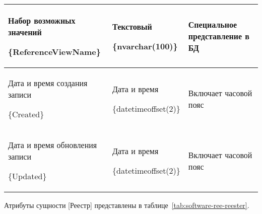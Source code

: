 \begin{myTable}
\begin{longtable}[h]{|p{}|p{}|p{}|}
	Набор возможных значений \par \{ReferenceViewName\} & Текстовый \par \{nvarchar(100)\} & Специальное представление в БД \\ \hline
	Дата и время создания записи \par \{Created\} & Дата и время \par \{datetimeoffset(2)\} & Включает часовой пояс \\ \hline
	Дата и время обновления записи \par \{Updated\} & Дата и время \par \{datetimeoffset(2)\} & Включает часовой пояс \\ \hline
\end{longtable}
\end{myTable}

Атрибуты сущности [Реестр] представлены в таблице~\ref{tab:software-ree-reester}.

